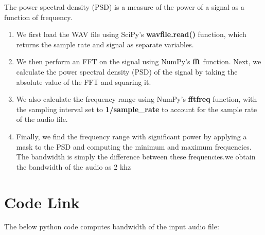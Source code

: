 \documentclass[journal,12pt,twocolumn]{article}
\begin{document}
	The power spectral density (PSD) is a measure of the power of a signal as a function of frequency. 
	
\begin{enumerate}

\item{We first load the WAV file using SciPy's \textbf{wavfile.read()} function, which returns the sample rate and signal as separate variables.}
	
\item{We then perform an FFT on the signal using NumPy's \textbf{fft} function. Next, we calculate the power spectral density (PSD) of the signal by taking the absolute value of the FFT and squaring it.} 
	
\item{We also calculate the frequency range using NumPy's \textbf{fftfreq} function, with the sampling interval set to \textbf{1/sample\_rate} to account for the sample rate of the audio file.} 
	
\item{Finally, we find the frequency range with significant power by applying a mask to the PSD and computing the minimum and maximum frequencies. The bandwidth is simply the difference between these frequencies.we obtain the bandwidth of the audio as 2 khz}

	
\end{enumerate}
   \section{Code Link}
	The below python code computes bandwidth of the input audio file:
	\vspace{2cm}
\end{document}
